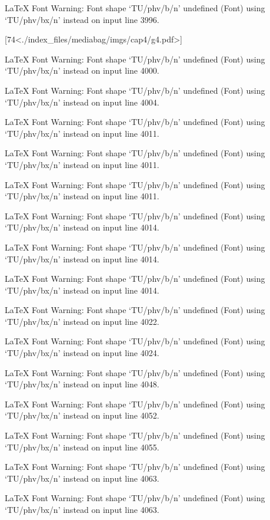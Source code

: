LaTeX Font Warning: Font shape `TU/phv/b/n' undefined
(Font)              using `TU/phv/bx/n' instead on input line 3996.

[74<./index_files/mediabag/imgs/cap4/g4.pdf>]

LaTeX Font Warning: Font shape `TU/phv/b/n' undefined
(Font)              using `TU/phv/bx/n' instead on input line 4000.


LaTeX Font Warning: Font shape `TU/phv/b/n' undefined
(Font)              using `TU/phv/bx/n' instead on input line 4004.


LaTeX Font Warning: Font shape `TU/phv/b/n' undefined
(Font)              using `TU/phv/bx/n' instead on input line 4011.


LaTeX Font Warning: Font shape `TU/phv/b/n' undefined
(Font)              using `TU/phv/bx/n' instead on input line 4011.


LaTeX Font Warning: Font shape `TU/phv/b/n' undefined
(Font)              using `TU/phv/bx/n' instead on input line 4011.


LaTeX Font Warning: Font shape `TU/phv/b/n' undefined
(Font)              using `TU/phv/bx/n' instead on input line 4014.


LaTeX Font Warning: Font shape `TU/phv/b/n' undefined
(Font)              using `TU/phv/bx/n' instead on input line 4014.


LaTeX Font Warning: Font shape `TU/phv/b/n' undefined
(Font)              using `TU/phv/bx/n' instead on input line 4014.


LaTeX Font Warning: Font shape `TU/phv/b/n' undefined
(Font)              using `TU/phv/bx/n' instead on input line 4022.


LaTeX Font Warning: Font shape `TU/phv/b/n' undefined
(Font)              using `TU/phv/bx/n' instead on input line 4024.


LaTeX Font Warning: Font shape `TU/phv/b/n' undefined
(Font)              using `TU/phv/bx/n' instead on input line 4048.


LaTeX Font Warning: Font shape `TU/phv/b/n' undefined
(Font)              using `TU/phv/bx/n' instead on input line 4052.


LaTeX Font Warning: Font shape `TU/phv/b/n' undefined
(Font)              using `TU/phv/bx/n' instead on input line 4055.


LaTeX Font Warning: Font shape `TU/phv/b/n' undefined
(Font)              using `TU/phv/bx/n' instead on input line 4063.


LaTeX Font Warning: Font shape `TU/phv/b/n' undefined
(Font)              using `TU/phv/bx/n' instead on input line 4063.


